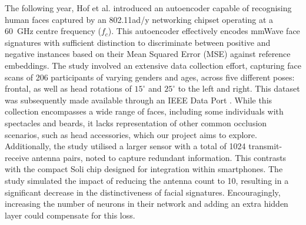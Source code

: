 \documentclass{mpaper}
\begin{document}
The following year, Hof et al. \cite{hof2020face} introduced an autoencoder capable of recognising human faces captured by an 802.11ad/y networking chipset operating at a \qty{60}{\GHz} centre frequency ($f_c$). This autoencoder effectively encodes mmWave face signatures with sufficient distinction to discriminate between positive and negative instances based on their Mean Squared Error (MSE) against reference embeddings. The study involved an extensive data collection effort, capturing face scans of 206 participants of varying genders and ages, across five different poses: frontal, as well as head rotations of $15^\circ$ and $25^\circ$ to the left and right. This dataset was subsequently made available through an IEEE Data Port \cite{mmwavefacedata}. While this collection encompasses a wide range of faces, including some individuals with spectacles and beards, it lacks representation of other common occlusion scenarios, such as head accessories, which our project aims to explore. Additionally, the study utilised a larger sensor with a total of 1024 transmit-receive antenna pairs, noted to capture redundant information. This contrasts with the compact Soli chip designed for integration within smartphones. The study simulated the impact of reducing the antenna count to 10, resulting in a significant decrease in the distinctiveness of facial signatures. Encouragingly, increasing the number of neurons in their network and adding an extra hidden layer could compensate for this loss.
\end{document}
